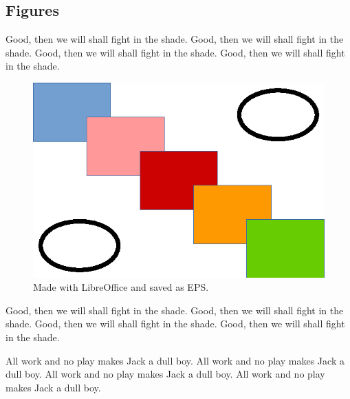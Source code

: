 
%
%

%
%

\subsection{Figures}
\label{sec:discussion_figures}

Good, then we will shall fight in the shade.
Good, then we will shall fight in the shade.
Good, then we will shall fight in the shade.
Good, then we will shall fight in the shade.

\begin{figure}[h]
\centering
\includegraphics{../figures/shapes.eps}
\caption{Made with LibreOffice and saved as EPS.}
\label{fig:shapes}
\end{figure}

Good, then we will shall fight in the shade.
Good, then we will shall fight in the shade.
Good, then we will shall fight in the shade.
Good, then we will shall fight in the shade.

All work and no play makes Jack a dull boy.
All work and no play makes Jack a dull boy.
All work and no play makes Jack a dull boy.
All work and no play makes Jack a dull boy.

